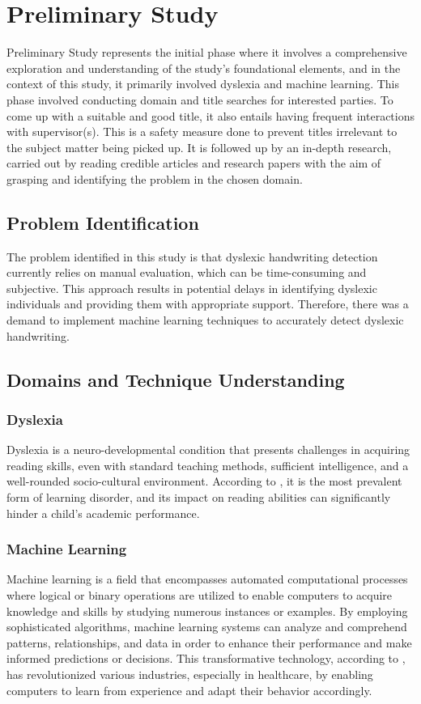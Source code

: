 \newpage
\section{Preliminary Study}
Preliminary Study represents the initial phase where it involves a comprehensive exploration and understanding of the study's foundational elements, and in the context of this study, it primarily involved dyslexia and machine learning. This phase involved conducting domain and title searches for interested parties. To come up with a suitable and good title, it also entails having frequent interactions with supervisor(s). This is a safety measure done to prevent titles irrelevant to the subject matter being picked up. It is followed up by an in-depth research, carried out by reading credible articles and research papers with the aim of grasping and identifying the problem in the chosen domain.

\subsection{Problem Identification}
The problem identified in this study is that dyslexic handwriting detection currently relies on manual evaluation, which can be time-consuming and subjective. This approach results in potential delays in identifying dyslexic individuals and providing them with appropriate support. Therefore, there was a demand to implement machine learning techniques to accurately detect dyslexic handwriting.

\newpage
\subsection{Domains and Technique Understanding}

\subsubsection{Dyslexia}
Dyslexia is a neuro-developmental condition that presents challenges in acquiring reading skills, even with standard teaching methods, sufficient intelligence, and a well-rounded socio-cultural environment. According to \textcite{Wajuihian2011DyslexiaAO}, it is the most prevalent form of learning disorder, and its impact on reading abilities can significantly hinder a child's academic performance.

\subsubsection{Machine Learning}
Machine learning is a field that encompasses automated computational processes where logical or binary operations are utilized to enable computers to acquire knowledge and skills by studying numerous instances or examples. By employing sophisticated algorithms, machine learning systems can analyze and comprehend patterns, relationships, and data in order to enhance their performance and make informed predictions or decisions. This transformative technology, according to \textcite{Fulkerson1995}, has revolutionized various industries, especially in healthcare, by enabling computers to learn from experience and adapt their behavior accordingly.

